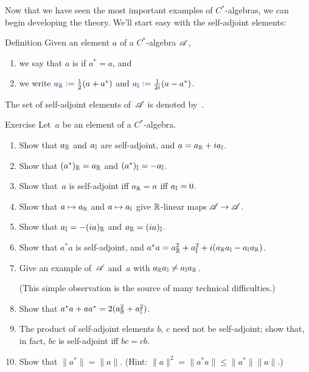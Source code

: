 \documentclass[main]{subfiles}
\begin{document}
\begin{parsec}%
\begin{point}%
Now that we have seen the most important examples
of $C^*$-algebras,
we can begin developing the theory.
We'll start easy with the self-adjoint elements:
\end{point}
\begin{point}{Definition}%
Given an element $a$ of a $C^*$-algebra $\mathscr{A}$, 
\begin{enumerate}
\item we say that $a$ is  if $a^* =a$, and
\item we write $\Define{\Real{a}}:= \frac{1}{2}(a+a^*)$
and $\Define{\Imag{a}}:=\frac{1}{2i}(a-a^*)$.
\end{enumerate}
The set of self-adjoint elements of~$\mathscr{A}$
is denoted by~\Define{$\sa{\scrA}$}.
\end{point}
\begin{point}{Exercise}%
Let~$a$ be an element of a $C^*$-algebra.
\begin{enumerate}
\item 
Show that $a_{\mathbb{R}}$ and $a_{\mathbb{I}}$ are self-adjoint,
and  $a= a_{\mathbb{R}}+ia_{\mathbb{I}}$.
\item
Show that $(a^*)_{\mathbb{R}}=a_{\mathbb{R}}$ and $(a^*)_{\mathbb{I}}=-a_{\mathbb{I}}$.
\item 
Show that~$a$ is self-adjoint iff $a_{\mathbb{R}}=a$ iff $a_{\mathbb{I}}=0$.
\item
Show that $a\mapsto a_{\mathbb{R}}$ and $a\mapsto a_{\mathbb{I}}$
give $\mathbb{R}$-linear maps $\mathscr{A}\to\mathscr{A}$.
\item
Show that $a_{\mathbb{I}} = -(ia)_{\mathbb{R}}$ and $a_{\mathbb{R}}=(ia)_{\mathbb{I}}$.
\item
Show that $a^*a$ is self-adjoint,
and  $a^*a=a_{\mathbb{R}}^2+a_{\mathbb{I}}^2+i(a_{\mathbb{R}}a_{\mathbb{I}}-a_{\mathbb{I}}a_{\mathbb{R}})$.
\item
Give an example of~$\mathscr{A}$ and~$a$ 
with  $a_{\mathbb{R}}a_{\mathbb{I}} \neq a_{\mathbb{I}}a_{\mathbb{R}}$.

(This simple observation is the source of many technical difficulties.)
\item
Show that $a^*a+aa^* = 2(a_{\mathbb{R}}^2+a_{\mathbb{I}}^2)$.
\item
The product of self-adjoint elements $b$, $c$ need not be self-adjoint;
show that, in fact, $bc$ is self-adjoint iff $bc=cb$.
\item
Show that $\|a^*\| = \|a\|$. (Hint:  $\|a\|^2=\|a^*a\|\leq \|a^*\|\|a\|$.)
\end{enumerate}
\end{point}
\end{parsec}
\end{document}
